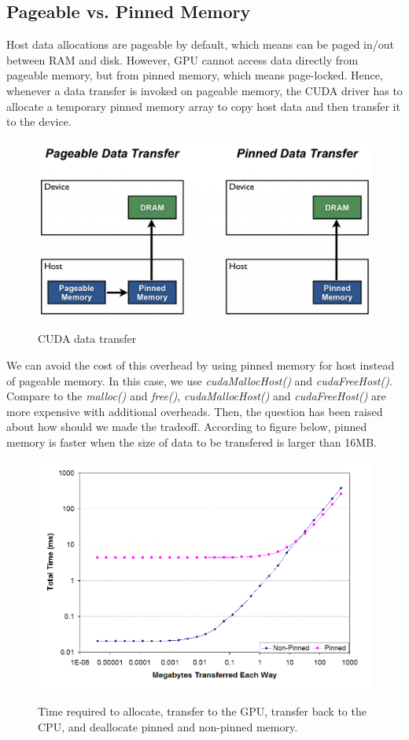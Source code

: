 \documentclass[journal,12pt,onecolumn,draftclsnofoot]{ieeeconf}  %
\begin{document}
\subsection{Pageable vs. Pinned Memory}
Host data allocations are pageable by default, which means can be paged in/out between RAM and disk. However, GPU cannot access data directly from pageable memory, but from pinned memory, which means page-locked. Hence, whenever a data transfer is invoked on pageable memory, the CUDA driver has to allocate a temporary pinned memory array to copy host data and then transfer it to the device. \par
\begin{figure}[h]
	\centering\includegraphics[width=120mm]{pinned.jpg}
	\caption{CUDA data transfer}
	\label{CUDA data transfer.}
	\cite{Mark}
\end{figure}
We can avoid the cost of this overhead by using pinned memory for host instead of pageable memory. In this case, we use \textit{cudaMallocHost()} and \textit{cudaFreeHost()}. Compare to the \textit{malloc()} and \textit{free()}, \textit{cudaMallocHost()} and \textit{cudaFreeHost()} are more expensive with additional overheads. Then, the question has been raised about how should we made the tradeoff. According to figure below, pinned memory is faster when the size of data to be transfered is larger than 16MB. \par
\begin{figure}[h]
 	\centering\includegraphics[width=120mm]{pinned_trade_off.png}
 	\caption{Time required to allocate, transfer to the GPU, transfer back to the CPU, and deallocate pinned and non-pinned memory.}
 	\label{Time required to allocate, transfer to the GPU, transfer back to the CPU, and deallocate pinned and non-pinned memory.}
 	\cite{Trade_off}
\end{figure}
\end{document}
